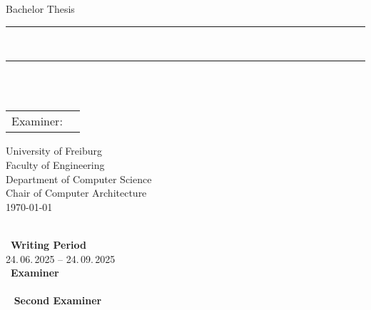 
\begin{titlepage}
	\begin{center}

		\newcommand{\HorizontalLine}{\rule{\linewidth}{0.3mm}}

		{\Large Bachelor Thesis}\\[1.3cm]

		\HorizontalLine \\[0.4cm]
		{ \huge \bfseries \thetitle }
		\HorizontalLine \\[1.5cm]

		{\Huge \theauthor} \\[2cm]

		\begin{tabular}[hc]{>{\huge}l >{\huge}l}
			Examiner: & \firstexaminer \\[0.3cm]
		\end{tabular}
		\vfill  %

		\Large {
			University of Freiburg\\
			Faculty of Engineering\\
			Department of Computer Science\\
			Chair of Computer Architecture\\[1cm]

			\today
		}
	\end{center}
\end{titlepage}

\thispagestyle{empty}
\ \vfill \ \\  %
\
\textbf{Writing Period}            \smallskip{} \\
24.\,06.\,2025 -- 24.\,09.\,2025   \bigskip{} \\
\
\textbf{Examiner}                  \smallskip{} \\
\firstexaminer                     \bigskip{} \\
\
\ifdef{\secondexaminer}
{
	\textbf{Second Examiner}       \smallskip{} \\
	\secondexaminer                \bigskip{} \\
	\
}
{
}
